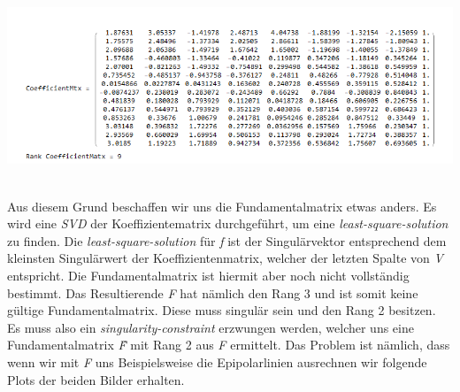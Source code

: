 \begin{minipage}{\linewidth}
	\centering
	\includegraphics[width=1\linewidth]{images/KoefficientMtx.png}
\end{minipage}\\

Aus diesem Grund beschaffen wir uns die Fundamentalmatrix etwas anders. Es wird eine \textit{SVD} der Koeffizientematrix durchgeführt, um eine \textit{least-square-solution} zu finden. Die \textit{least-square-solution} für \textit{f} ist der Singulärvektor entsprechend dem kleinsten Singulärwert der Koeffizientenmatrix, welcher der letzten Spalte von \textit{V} entspricht. Die Fundamentalmatrix ist hiermit aber noch nicht vollständig bestimmt. Das Resultierende \textit{F} hat nämlich den Rang 3 und ist somit keine gültige Fundamentalmatrix. Diese muss singulär sein und den Rang 2 besitzen. Es muss also ein \textit{singularity-constraint} erzwungen werden, welcher uns eine Fundamentalmatrix \textit{\^F} mit Rang 2 aus \textit{F} ermittelt. Das Problem ist nämlich, dass wenn wir mit \textit{F} uns Beispielsweise die Epipolarlinien ausrechnen wir folgende Plots der beiden Bilder erhalten.\\


